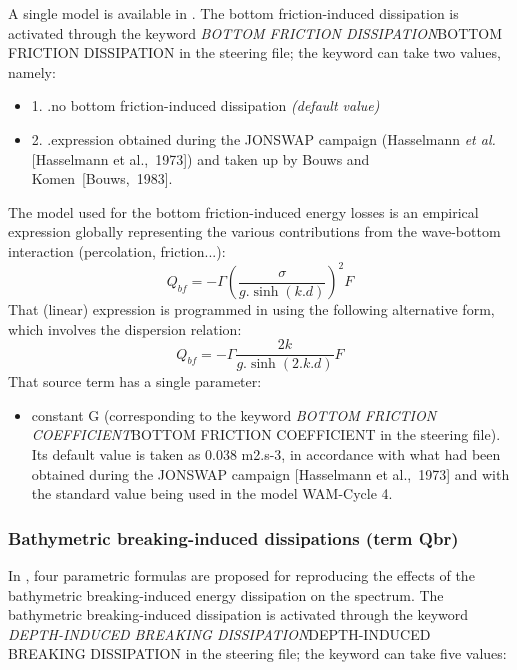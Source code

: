  A single model is available in \tomawac. The bottom friction-induced dissipation is activated through the keyword \textit{BOTTOM FRICTION DISSIPATION}BOTTOM FRICTION DISSIPATION\textit{ }in the steering file; the keyword can take two values, namely:

 \begin{itemize}
\item 1. .no bottom friction-induced dissipation \textit{(default value)}

 \item 2. .expression obtained during the JONSWAP campaign (Hasselmann \textit{et al.} [Hasselmann et al.,~1973]) and taken up by Bouws and Komen~[Bouws,~1983].
\end{itemize}

 The model used for the bottom friction-induced energy losses is an empirical expression globally representing the various contributions from the wave-bottom interaction (percolation, friction...):
\begin{equation} \label{GrindEQ__4_42_}
Q_{bf} =-\Gamma \left(\frac{\sigma }{g.\sinh \left(k.d\right)} \right)^{2} F
\end{equation}
That (linear) expression is programmed in \tomawac using the following alternative form, which involves the dispersion relation:
\begin{equation} \label{GrindEQ__4_43_}
Q_{bf} =-\Gamma \frac{2k}{g.\sinh \left(2.k.d\right)} F
\end{equation}
That source term has a single parameter:

\begin{itemize}
\item  constant G (corresponding to the keyword \textit{BOTTOM FRICTION COEFFICIENT}BOTTOM FRICTION COEFFICIENT\textit{ }in the steering file). Its default value is taken as 0.038 m2.s-3, in accordance with what had been obtained during the JONSWAP campaign [Hasselmann et al.,~1973] and with the standard value being used in the model WAM-Cycle 4.
\end{itemize}


\subsubsection{ Bathymetric breaking-induced dissipations (term Qbr)}

 In \tomawac, four parametric formulas are proposed for reproducing the effects of the bathymetric breaking-induced energy dissipation on the spectrum. The bathymetric breaking-induced dissipation is activated through the keyword \textit{DEPTH-INDUCED BREAKING DISSIPATION}DEPTH-INDUCED BREAKING DISSIPATION\textit{ }in the steering file; the keyword can take five values:

